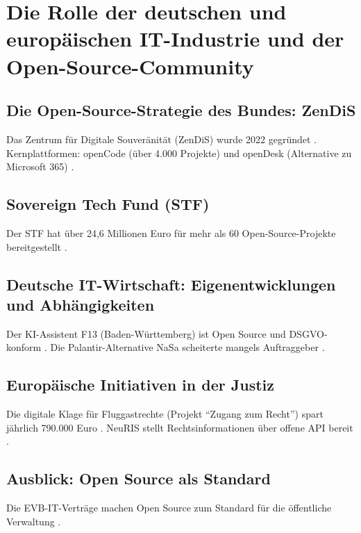 \documentclass[12pt,a4paper]{article}
\begin{document}
	\section{Die Rolle der deutschen und europäischen IT-Industrie und der Open-Source-Community}
	
	\subsection{Die Open-Source-Strategie des Bundes: ZenDiS}
	
	Das Zentrum für Digitale Souveränität (ZenDiS) wurde 2022 gegründet \cite{ZenDiS2025}. Kernplattformen: openCode (über 4.000 Projekte) und openDesk (Alternative zu Microsoft 365) \cite{Heise2025a, AllThingsOpen2025}.
	
	\subsection{Sovereign Tech Fund (STF)}
	
	Der STF hat über 24,6 Millionen Euro für mehr als 60 Open-Source-Projekte bereitgestellt \cite{SovereignTechFund2025}.
	
	\subsection{Deutsche IT-Wirtschaft: Eigenentwicklungen und Abhängigkeiten}
	
	Der KI-Assistent F13 (Baden-Württemberg) ist Open Source und DSGVO-konform \cite{Staatsanzeiger2025}. Die Palantir-Alternative NaSa scheiterte mangels Auftraggeber \cite{Tagesschau2025b}.
	
	\subsection{Europäische Initiativen in der Justiz}
	
	Die digitale Klage für Fluggastrechte (Projekt \enquote{Zugang zum Recht}) spart jährlich 790.000 Euro \cite{Heise2025c}. NeuRIS stellt Rechtsinformationen über offene API bereit \cite{NeuRIS2025}.
	
	\subsection{Ausblick: Open Source als Standard}
	
	Die EVB-IT-Verträge machen Open Source zum Standard für die öffentliche Verwaltung \cite{ZenDiS2025}.
	
\end{document}
